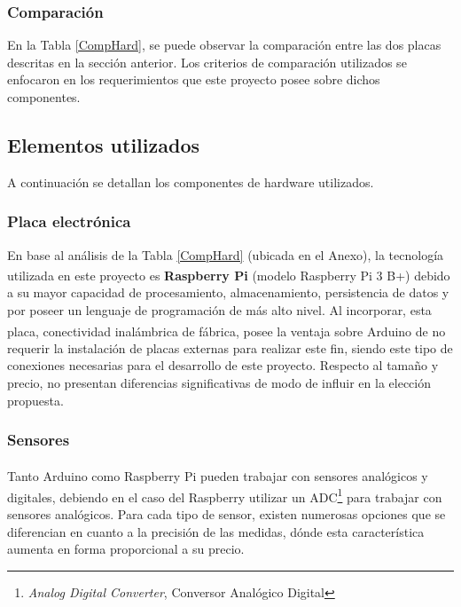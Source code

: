             \subsubsection{Comparación}
                \par En la Tabla \ref{CompHard}, se puede observar la comparación entre las dos placas descritas en la sección anterior. Los criterios de comparación utilizados se enfocaron en los requerimientos que este proyecto posee sobre dichos componentes.
        
    \subsection{Elementos utilizados}
    \label{subseccionElementosutilizados}
        \par A continuación se detallan los componentes de hardware utilizados.
        
        \subsubsection{Placa electrónica}
            \par En base al análisis de la Tabla \ref{CompHard} (ubicada en el Anexo), la tecnología utilizada en este proyecto es \textbf{Raspberry\textsuperscript{\textregistered} Pi} (modelo Raspberry\textsuperscript{\textregistered} Pi 3 B+) debido a su mayor capacidad de procesamiento, almacenamiento, persistencia de datos y por poseer un lenguaje de programación de más alto nivel. Al incorporar, esta placa, conectividad inalámbrica de fábrica, posee la ventaja sobre Arduino\textsuperscript{\textregistered} de no requerir la instalación de placas externas para realizar este fin, siendo este tipo de conexiones necesarias para el desarrollo de este proyecto. Respecto al tamaño y precio, no presentan diferencias significativas de modo de influir en la elección propuesta.

        \subsubsection{Sensores}
            \par Tanto Arduino\textsuperscript{\textregistered} como Raspberry\textsuperscript{\textregistered} Pi pueden trabajar con sensores analógicos y digitales, debiendo en el caso del Raspberry\textsuperscript{\textregistered} utilizar un ADC\footnote{\textit{Analog Digital Converter}, Conversor Analógico Digital} para trabajar con sensores analógicos. Para cada tipo de sensor, existen numerosas opciones que se diferencian en cuanto a la precisión de las medidas, dónde esta característica aumenta en forma proporcional a su precio. 
            
